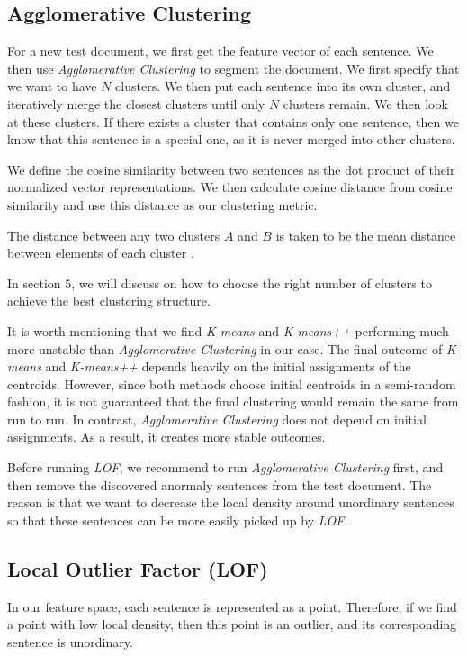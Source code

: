 \documentclass[conference,compsoc]{IEEEtran}
\begin{document}
  \subsection{Agglomerative Clustering}
  For a new test document, we first get the feature vector of each sentence. We then use \emph{Agglomerative Clustering} to segment the document. We first specify that we want to have $N$ clusters. We then put each sentence into its own cluster, and iteratively merge the closest clusters until only $N$ clusters remain. We then look at these clusters. If there exists a cluster that contains only one sentence, then we know that this sentence is a special one, as it is never merged into other clusters. 

  We define the cosine similarity between two sentences as the dot product of their normalized vector representations. We then calculate cosine distance from cosine similarity and use this distance as our clustering metric. 

  The distance between any two clusters $A$ and $B$ is taken to be the mean distance between elements of each cluster \cite{upgma}. 

  In section $5$, we will discuss on how to choose the right number of clusters to achieve the best clustering structure. 

  It is worth mentioning that we find \emph{K-means} and \emph{K-means++} performing much more unstable than \emph{Agglomerative Clustering} in our case. The final outcome of \emph{K-means} and \emph{K-means++} depends heavily on the initial assignments of the centroids. However, since both methods choose initial centroids in a semi-random fashion, it is not guaranteed that the final clustering would remain the same from run to run. In contrast, \emph{Agglomerative Clustering} does not depend on initial assignments. As a result, it creates more stable outcomes. 

  Before running \emph{LOF}, we recommend to run \emph{Agglomerative Clustering} first, and then remove the discovered anormaly sentences from the test document. The reason is that we want to decrease the local density around unordinary sentences so that these sentences can be more easily picked up by \emph{LOF}. 


  \subsection{Local Outlier Factor (LOF)}
  In our feature space, each sentence is represented as a point. Therefore, if we find a point with low local density, then this point is an outlier, and its corresponding sentence is unordinary. 
\end{document}
